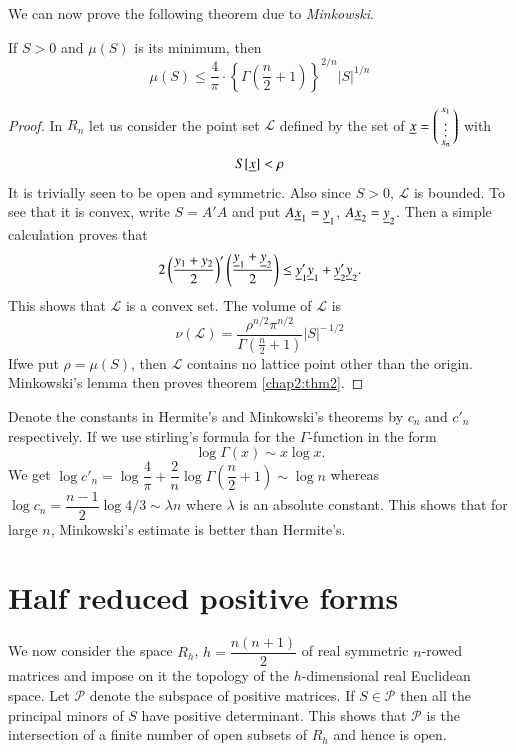 We can now prove the following theorem due to {\em Minkowski}.

\begin{thm}\label{chap2:thm2}
If $S>0$ and $\mu(S)$ is its minimum, then 
$$
\mu(S)\leq \frac{4}{\pi}\cdot
\left\{\Gamma\left(\frac{n}{2}+1\right)\right\}^{2/n}|S|^{1/n} 
$$
\end{thm}

\begin{proof}
In $R_{n}$ let us consider the point set $\mathscr{L}$ defined by the
set of $\underline{x}=\left(\begin{smallmatrix}
  x_{1}\\ \vdots\\ x_{n}\end{smallmatrix}\right)$ with
$$
S[\underline{x}]< \rho
$$
It is trivially seen to be open and symmetric. Also since $S>0$,
$\mathscr{L}$ is bounded. To see that it is convex, write $S=A'A$ and
put $A\underline{x}_{1}=\underline{y}_{1}$, $A\underline{x}_{2}=\underline{y}_{2}$. Then a simple
calculation proves that
$$
2\left(\frac{y_{1}+y_{2}}{2}\right)'\left(\frac{\underline{y}_{1}+\underline{y}_{2}}{2}\right)\leq 
\underline{y}'_{1}\underline{y}_{1}+\underline{y}'_{2}\underline{y}_{2}. 
$$ 
This shows that $\mathscr{L}$ is a convex set. The volume of
$\mathscr{L}$ is
$$
\nu(\mathscr{L}) = \frac{\rho^{n/2} \pi^{n/2}}{\Gamma(\frac{n}{2}+1)}
\big| S \big|^{- \,1/2}
$$
If\pageoriginale we put $\rho=\mu(S)$, then $\mathscr{L}$
contains no lattice point other than the origin. Minkowski's lemma
then proves theorem \ref{chap2:thm2}.
\end{proof}

Denote the constants in Hermite's and Minkowski's theorems by $c_{n}$
and $c'_{n}$ respectively. If we use stirling's formula for the
$\Gamma$-function in the form
$$
\log\Gamma(x)\sim x\log x.
$$
We get $\log
c'_{n} = \log\dfrac{4}{\pi} + \dfrac{2}{n} \log \Gamma
\left(\dfrac{n}{2}+1\right)\sim\log 
n$ whereas $\log c_{n}=\dfrac{n-1}{2}\log 4/3\sim\lambda n$ where
$\lambda$ is an absolute constant. This shows that for large $n$,
Minkowski's estimate is better than Hermite's. 

\section{Half reduced positive forms}\label{chap2:sec3}

We now consider the space $R_{h}$, $h=\dfrac{n(n+1)}{2}$ of real
symmetric $n$-rowed matrices and impose on it the topology of the
$h$-dimensional real Euclidean space. Let $\mathscr{P}$ denote the
subspace of positive matrices. If $S\in\mathscr{P}$ then all the
principal minors of $S$ have positive determinant. This shows that
$\mathscr{P}$ is the intersection of a finite number of open subsets
of $R_{h}$ and hence is open.

